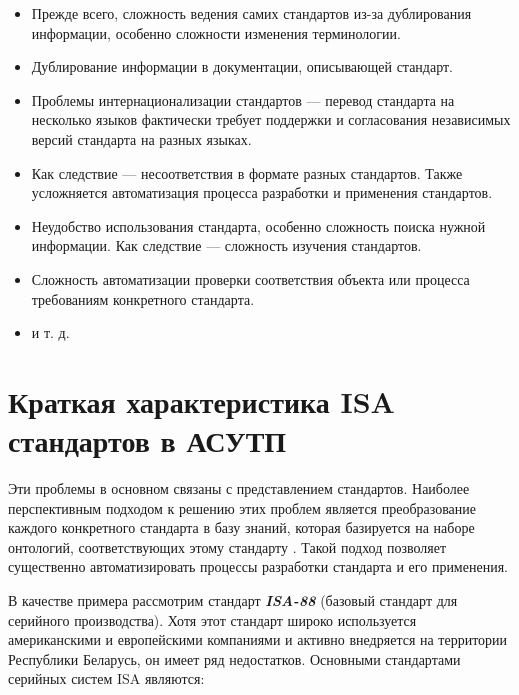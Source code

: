 \begin{itemize}
    \item Прежде всего, сложность ведения самих стандартов из-за дублирования информации, особенно сложности изменения терминологии.
    \item Дублирование информации в документации, описывающей стандарт.
    \item Проблемы интернационализации стандартов — перевод стандарта на несколько языков фактически требует поддержки и согласования независимых версий стандарта на разных языках.
    \item Как следствие — несоответствия в формате разных стандартов. Также усложняется автоматизация процесса разработки и применения стандартов.
    \item Неудобство использования стандарта, особенно сложность поиска нужной информации. Как следствие — сложность изучения стандартов.
    \item Сложность автоматизации проверки соответствия объекта или процесса требованиям конкретного стандарта.
    \item и т. д.
\end{itemize}

\section{Краткая характеристика ISA стандартов в АСУТП}

Эти проблемы в основном связаны с представлением стандартов. Наиболее перспективным подходом к решению этих проблем является преобразование каждого конкретного стандарта в базу знаний, которая базируется на наборе онтологий, соответствующих этому стандарту \cite{Серенков2004, Углев2012}. Такой подход позволяет существенно автоматизировать процессы разработки стандарта и его применения.

В качестве примера рассмотрим стандарт \textbf{\textit{ISA-88}} \cite{ISA88} (базовый стандарт для серийного производства). Хотя этот стандарт широко используется американскими и европейскими компаниями и активно внедряется на территории Республики Беларусь, он имеет ряд недостатков. Основными стандартами серийных систем ISA являются:

